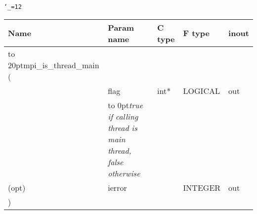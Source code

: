 \begingroup\tt\catcode`\_=12
\begin{tabular}{lllll}
\toprule
\textrm{Name}&\textrm{Param name}&\textrm{C type}&\textrm{F type}&\textrm{inout}\\
\midrule
\hbox to 20pt{mpi_is_thread_main (\hss} \\
&flag&int*&LOGICAL&out\\ [-3pt]
&\hbox to 0pt{\footnotesize\sl true if calling thread is main thread, false otherwise\hss}\\
(opt)&ierror&&INTEGER&out\\
)\\
\bottomrule
\end{tabular}
\endgroup

